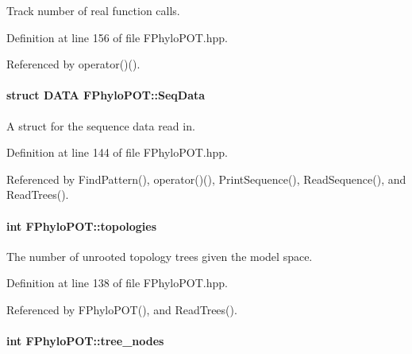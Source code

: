 \-Track number of real function calls. 



\-Definition at line 156 of file \-F\-Phylo\-P\-O\-T.\-hpp.



\-Referenced by operator()().

\hypertarget{classFPhyloPOT_aa80ced607ed41f02bcd56b6f08fbd1ff}{
\paragraph[{\-Seq\-Data}]{\setlength{\rightskip}{0pt plus 5cm}struct {\bf \-D\-A\-T\-A} {\bf \-F\-Phylo\-P\-O\-T\-::\-Seq\-Data}}}\label{classFPhyloPOT_aa80ced607ed41f02bcd56b6f08fbd1ff}


\-A struct for the sequence data read in. 



\-Definition at line 144 of file \-F\-Phylo\-P\-O\-T.\-hpp.



\-Referenced by \-Find\-Pattern(), operator()(), \-Print\-Sequence(), \-Read\-Sequence(), and \-Read\-Trees().

\hypertarget{classFPhyloPOT_af68e59b4d63e18f0b82864b101fd29d2}{
\paragraph[{topologies}]{\setlength{\rightskip}{0pt plus 5cm}int {\bf \-F\-Phylo\-P\-O\-T\-::topologies}}}\label{classFPhyloPOT_af68e59b4d63e18f0b82864b101fd29d2}


\-The number of unrooted topology trees given the model space. 



\-Definition at line 138 of file \-F\-Phylo\-P\-O\-T.\-hpp.



\-Referenced by \-F\-Phylo\-P\-O\-T(), and \-Read\-Trees().

\hypertarget{classFPhyloPOT_ab30590c070d95d5d5d7966cb386db7d6}{
\paragraph[{tree\-\_\-nodes}]{\setlength{\rightskip}{0pt plus 5cm}int {\bf \-F\-Phylo\-P\-O\-T\-::tree\-\_\-nodes}}}\label{classFPhyloPOT_ab30590c070d95d5d5d7966cb386db7d6}


